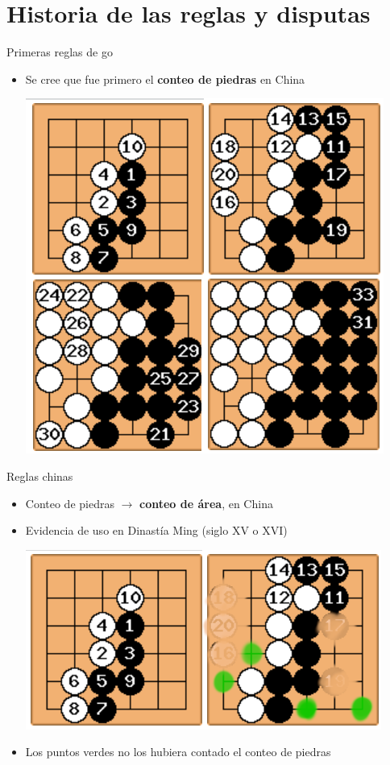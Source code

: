 \documentclass{beamer}
\begin{document}
\section{Historia de las reglas y disputas}

\begin{frame}{Primeras reglas de go}
  
  \begin{itemize}
    \item Se cree que fue primero el \textbf{conteo de piedras} en China
    
    \includegraphics[scale=0.3]{conteopiedraspartida.png}
    
  \end{itemize}
  
\end{frame}

\begin{frame}{Reglas chinas}
  
  \begin{itemize}
    \item Conteo de piedras $\rightarrow$ \textbf{conteo de área}, en China
    \item Evidencia de uso en Dinastía Ming (siglo XV o XVI)
    
    \includegraphics[scale=0.5]{conteoareapartida.png}
    
    \item Los puntos verdes no los hubiera contado el conteo de piedras
  \end{itemize}
  
\end{frame}
\end{document}
